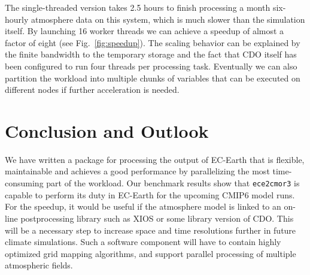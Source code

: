 \documentclass[procedia]{easychair}
\begin{document}
The single-threaded version takes 2.5 hours to finish processing a month 
six-hourly atmosphere data on this system, which is much slower than the 
simulation itself. By launching 16 worker threads we can achieve a speedup of 
almost a factor of eight (see Fig.~\ref{fig:speedup}). The scaling behavior can be explained by the finite 
bandwidth to the temporary storage and the fact that CDO itself has been 
configured to run four threads per processing task. Eventually we can also 
partition the workload into multiple chunks of variables that can be executed 
on different nodes if further acceleration is needed.


\section{Conclusion and Outlook}

We have written a package for processing the output of EC-Earth that is 
flexible, maintainable and achieves a good performance by parallelizing the 
most time-consuming part of the workload. Our benchmark results show that \texttt{ece2cmor3}
is capable to perform its duty in EC-Earth for the upcoming CMIP6 model runs. For the speedup, it would be 
useful if the atmosphere model is linked to an on-line postprocessing library such as XIOS or some library version of CDO. This will 
be a necessary step to increase space and time resolutions further in future 
climate simulations. Such a software component will have to contain highly 
optimized grid mapping algorithms, and support parallel processing of multiple 
atmospheric fields.



%
\label{sect:bib}

%
%
%


\end{document}
